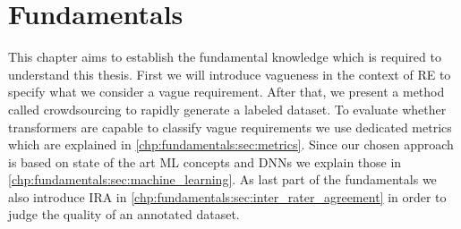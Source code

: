\chapter{Fundamentals}
\label{chp:fundamentals}

This chapter aims to establish the fundamental knowledge which is required to understand this thesis.
First we will introduce vagueness in the context of \ac{RE} to specify what we consider a vague requirement.
After that, we present a method called crowdsourcing to rapidly generate a labeled dataset.
To evaluate whether transformers are capable to classify vague requirements we use dedicated metrics which are explained in \cref{chp:fundamentals:sec:metrics}.
Since our chosen approach is based on state of the art \ac{ML} concepts and \acp{DNN} we explain those in \cref{chp:fundamentals:sec:machine_learning}.
As last part of the fundamentals we also introduce \ac{IRA} in \cref{chp:fundamentals:sec:inter_rater_agreement} in order to judge the quality of an annotated dataset.






